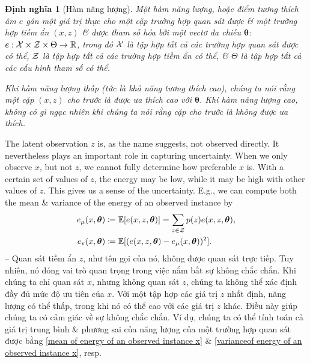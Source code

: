 \documentclass{article}
\newtheorem{dinhnghia}{Định nghĩa}
\begin{document}
\begin{dinhnghia}[Hàm năng lượng]
	Một {\rm hàm năng lượng}, hoặc {\rm điểm tương thích âm} $e$ gán một giá trị thực cho một cặp trường hợp quan sát được \& một trường hợp tiềm ẩn $(x,z)$ \& được tham số hóa bởi một vectơ đa chiều $\boldsymbol{\theta}$: $e:{\cal X}\times{\cal Z}\times\Theta\to\mathbb{R}$, trong đó ${\cal X}$ là tập hợp tất cả các trường hợp quan sát được có thể, ${\cal Z}$ là tập hợp tất cả các trường hợp tiềm ẩn có thể, \& $\Theta$ là tập hợp tất cả các cấu hình tham số có thể.
	
	Khi hàm năng lượng thấp (tức là khả năng tương thích cao), chúng ta nói rằng một cặp $(x,z)$ cho trước là {\rm được ưa thích cao} với $\boldsymbol{\theta}$. Khi hàm năng lượng cao, không có gì ngạc nhiên khi chúng ta nói rằng cặp cho trước là {\rm không được ưa thích}.
\end{dinhnghia}
The latent observation $z$ is, as the name suggests, not observed directly. It nevertheless plays an important role in capturing uncertainty. When we only observe $x$, but not $z$, we cannot fully determine how preferable $x$ is. With a certain set of values of $z$, the energy may be low, while it may be high with other values of $z$. This gives us a sense of the uncertainty. E.g., we can compute both the mean \& variance of the energy of an observed instance by
\begin{align}
	e_\mu(x,\boldsymbol{\theta})&\coloneqq\mathbb{E}[e(x,z,\boldsymbol{\theta})] = \sum_{z\in{\cal Z}} p(z)e(x,z,\boldsymbol{\theta}),\label{mean of energy of an observed instance x}\\
	e_{\rm v}(x,\boldsymbol{\theta})&\coloneqq\mathbb{E}[(e(x,z,\boldsymbol{\theta}) - e_\mu(x,\boldsymbol{\theta}))^2].\label{varianceof energy of an observed instance x}
\end{align}
-- Quan sát tiềm ẩn $z$, như tên gọi của nó, không được quan sát trực tiếp. Tuy nhiên, nó đóng vai trò quan trọng trong việc nắm bắt sự không chắc chắn. Khi chúng ta chỉ quan sát $x$, nhưng không quan sát $z$, chúng ta không thể xác định đầy đủ mức độ ưu tiên của $x$. Với một tập hợp các giá trị $z$ nhất định, năng lượng có thể thấp, trong khi nó có thể cao với các giá trị $z$ khác. Điều này giúp chúng ta có cảm giác về sự không chắc chắn. Ví dụ, chúng ta có thể tính toán cả giá trị trung bình \& phương sai của năng lượng của một trường hợp quan sát được bằng \eqref{mean of energy of an observed instance x} \& \eqref{varianceof energy of an observed instance x}, resp.
\end{document}
